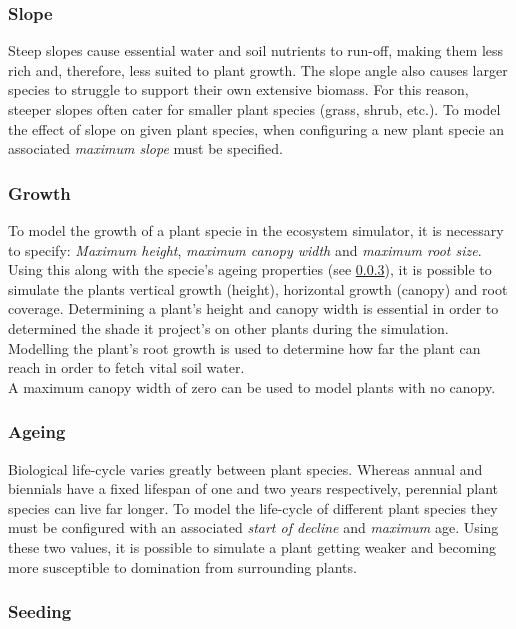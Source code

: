 \subsubsection{Slope}

Steep slopes cause essential water and soil nutrients to run-off, making them less rich and, therefore, less suited to plant growth. The slope angle also causes larger species to struggle to support their own extensive biomass. For this reason, steeper slopes often cater for smaller plant species (grass, shrub, etc.). To model the effect of slope on given plant species, when configuring a new plant specie an associated \textit{maximum slope} must be specified.

\subsubsection{Growth}

To model the growth of a plant specie in the ecosystem simulator, it is necessary to specify: \textit{Maximum height}, \textit{maximum canopy width} and \textit{maximum root size}. Using this along with the specie's ageing properties (see \ref{subsubsec:ageing_properties}), it is possible to simulate the plants vertical growth (height), horizontal growth (canopy) and root coverage. Determining a plant's height and canopy width is essential in order to determined the shade it project's on other plants during the simulation. Modelling the plant's root growth is used to determine how far the plant can reach in order to fetch vital soil water.\\
A maximum canopy width of zero can be used to model plants with no canopy.

\subsubsection{Ageing} \label{subsubsec:ageing_properties}

Biological life-cycle varies greatly between plant species. Whereas annual and biennials have a fixed lifespan of one and two years respectively, perennial plant species can live far longer. To model the life-cycle of different plant species they must be configured with an associated \textit{start of decline} and \textit{maximum} age. Using these two values, it is possible to simulate a plant getting weaker and becoming more susceptible to domination from surrounding plants.

\subsubsection{Seeding}

